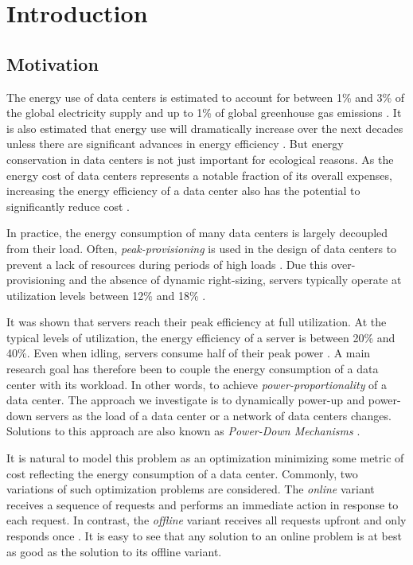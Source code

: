 
\chapter{Introduction}\label{chapter:introduction}

\section{Motivation}

The energy use of data centers is estimated to account for between 1\% and 3\% of the global electricity supply and up to 1\% of global greenhouse gas emissions \cite{Jones2018, Bashroush2020, Masanet2020}. It is also estimated that energy use will dramatically increase over the next decades unless there are significant advances in energy efficiency \cite{Jones2018}. But energy conservation in data centers is not just important for ecological reasons. As the energy cost of data centers represents a notable fraction of its overall expenses, increasing the energy efficiency of a data center also has the potential to significantly reduce cost \cite{Barroso2007}.

In practice, the energy consumption of many data centers is largely decoupled from their load. Often, \textit{peak-provisioning} is used in the design of data centers to prevent a lack of resources during periods of high loads \cite{Whitney2014}. Due this over-provisioning and the absence of dynamic right-sizing, servers typically operate at utilization levels between 12\% and 18\% \cite{Whitney2014}.

It was shown that servers reach their peak efficiency at full utilization. At the typical levels of utilization, the energy efficiency of a server is between 20\% and 40\%. Even when idling, servers consume half of their peak power \cite{Barroso2007}. A main research goal has therefore been to couple the energy consumption of a data center with its workload. In other words, to achieve \textit{power-proportionality} of a data center. The approach we investigate is to dynamically power-up and power-down servers as the load of a data center or a network of data centers changes. Solutions to this approach are also known as \textit{Power-Down Mechanisms} \cite{Jin2016}.

It is natural to model this problem as an optimization minimizing some metric of cost reflecting the energy consumption of a data center. Commonly, two variations of such optimization problems are considered. The \textit{online} variant receives a sequence of requests and performs an immediate action in response to each request. In contrast, the \textit{offline} variant receives all requests upfront and only responds once \cite{Karp1992}. It is easy to see that any solution to an online problem is at best as good as the solution to its offline variant.

